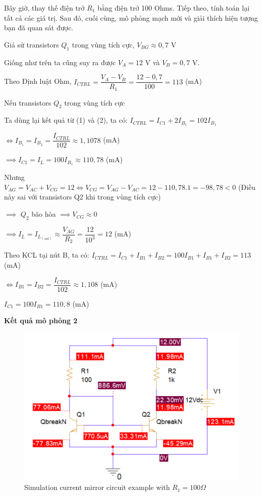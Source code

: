  Bây giờ, thay thế điện trở \(R_1\) bằng điện trở 100 Ohms. Tiếp theo, tính toán lại tất cả các giá trị.
 Sau đó, cuối cùng, mô phỏng mạch mới và giải thích hiện tượng bạn đã quan sát được.

Giả sử transistors \(Q_1\) trong vùng tích cực, \(V_{BG} \approx 0,7\) V

Giống như trên ta cũng suy ra được \(V_A = 12\) V và \(V_B = 0,7\) V.

 Theo Định luật Ohm, \(I_{CTRL} = \dfrac{V_A - V_B}{R_1} = \dfrac{12 - 0,7}{100} = 113 \) (mA)

 Nếu transistors \(Q_2\) trong vùng tích cực
 
 Ta dùng lại kết quả từ (1) và (2), ta có: \(I_{CTRL} = I_{C1} + 2I_{B_1} = 102I_{B_1}\)

 \(\iff I_{B_1} = I_{B_2} = \dfrac{I_{CTRL}}{102} \approx 1,1078 \) (mA)

 \(\implies I_{C1} = I_L = 100I_{B_1} \approx 110,78\) (mA)
 
Nhưng \(V_{AG} = V_{AC} + V_{CG} = 12 \iff V_{CG} = V_{AG} - V_{AC} = 12 - 110,78.1 = -98,78 < 0\) (Điều này sai với transistors Q2 khi trong vùng tích cực) 

\(\implies \) \(Q_2\) bão hòa \(\implies V_{CG} \approx 0 \)

\(\implies I_L = I_{L_{(sat)}} \approx \dfrac{V_{AG}}{R_2} = \dfrac{12}{10^3} = 12 \) (mA)

Theo KCL tại nút B, ta có: \(I_{CTRL} = I_{C1} + I_{B1} + I_{B2} = 100I_{B1} + I_{B1} + I_{B2} = 113\) (mA)

\(\iff I_{B1} = I_{B2} = \dfrac{I_{CTRL}}{102} \approx 1,108 \) (mA)

\(I_{C1} = 100I_{B1} = 110,8\) (mA)

\textbf{Kết quả mô phỏng 2}

\begin{figure}[ht]
    \centering
    \includegraphics[scale=0.3]{graphics/ex11/f3.png}
    \caption{Simulation current mirror circuit example with \(R_1 = 100 \Omega\)}
\end{figure}

